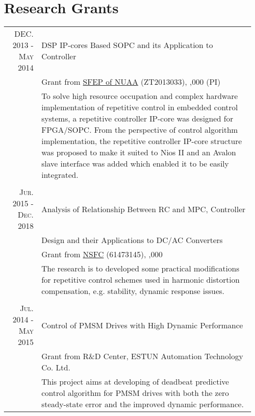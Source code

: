 \documentclass[a4paper,10pt]{article} %
\begin{document}
\section{Research Grants}

\begin{tabular}{r|p{11cm}}
\textsc{DEC. 2013 - May 2014} & DSP IP-cores Based SOPC and its Application to Controller\\
& Grant from \href{http://ded.nuaa.edu.cn/srf/}{SFEP of NUAA} (ZT2013033), \textyen 4,000 (PI)\\
& \footnotesize{To solve high resource occupation and complex hardware implementation of repetitive control in embedded control systems, a repetitive controller IP-core was designed  for FPGA/SOPC. From the perspective of control algorithm implementation, the repetitive controller IP-core structure was proposed to make it suited to Nios II and an Avalon slave interface was added which enabled it to be easily integrated.}\\
\multicolumn{2}{c}{} \\


\textsc{Jur. 2015 - Dec. 2018} & Analysis of Relationship Between RC and MPC, Controller\\
& Design and their Applications to DC/AC Converters\\
& Grant from \href{http://www.nsfc.gov.cn/}{NSFC} (61473145), \textyen 820,000\\
& \footnotesize{The research is to developed some practical modifications for repetitive control schemes used in harmonic distortion compensation, e.g. stability, dynamic response issues. }\\
\multicolumn{2}{c}{} \\


\textsc{Jul. 2014 - May 2015} & Control of PMSM Drives with High Dynamic Performance\\
& Grant from R\&D Center, ESTUN Automation Technology Co. Ltd.\\
& \footnotesize{This project aims at developing of deadbeat predictive control algorithm for PMSM drives with both the zero steady-state error and the improved dynamic performance.}
\end{tabular}

\end{document}
